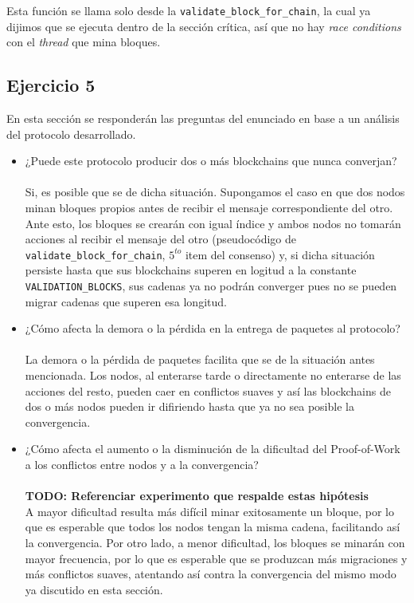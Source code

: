 \documentclass[10pt, a4paper, hidelinks]{article}
\begin{document}
Esta función se llama solo desde la \texttt{validate\_block\_for\_chain}, la cual ya dijimos que se ejecuta dentro de la sección crítica, así que no hay \textit{race conditions} con el \textit{thread} que mina bloques.

\subsection{Ejercicio 5}
En esta sección se responderán las preguntas del enunciado en base a un análisis del protocolo desarrollado.

\begin{itemize}
    \item ¿Puede este protocolo producir dos o más blockchains que nunca converjan? \\
    \\
    Si, es posible que se de dicha situación. Supongamos el caso en que dos nodos minan bloques propios antes de recibir el mensaje correspondiente del otro. Ante esto, los bloques se crearán con igual índice y ambos nodos no tomarán acciones al recibir el mensaje del otro (pseudocódigo de \texttt{validate\_block\_for\_chain}, $5^{to}$ item del consenso) y, si dicha situación persiste hasta que sus blockchains superen en logitud a la constante \texttt{VALIDATION\_BLOCKS}, sus cadenas ya no podrán converger pues no se pueden migrar cadenas que superen esa longitud.
    \item ¿Cómo afecta la demora o la pérdida en la entrega de paquetes al protocolo? \\
    \\
    La demora o la pérdida de paquetes facilita que se de la situación antes mencionada. Los nodos, al enterarse tarde o directamente no enterarse de las acciones del resto, pueden caer en conflictos suaves y así las blockchains de dos o más nodos pueden ir difiriendo hasta que ya no sea posible la convergencia.
    \item ¿Cómo afecta el aumento o la disminución de la dificultad del Proof-of-Work a los conflictos entre nodos y a la convergencia? \\
    \\
    \textbf{TODO: Referenciar experimento que respalde estas hipótesis} \\
    A mayor dificultad resulta más difícil minar exitosamente un bloque, por lo que es esperable que todos los nodos tengan la misma cadena, facilitando así la convergencia. Por otro lado, a menor dificultad, los bloques se minarán con mayor frecuencia, por lo que es esperable que se produzcan más migraciones y más conflictos suaves, atentando así contra la convergencia del mismo modo ya discutido en esta sección.   
\end{itemize}
\end{document}
